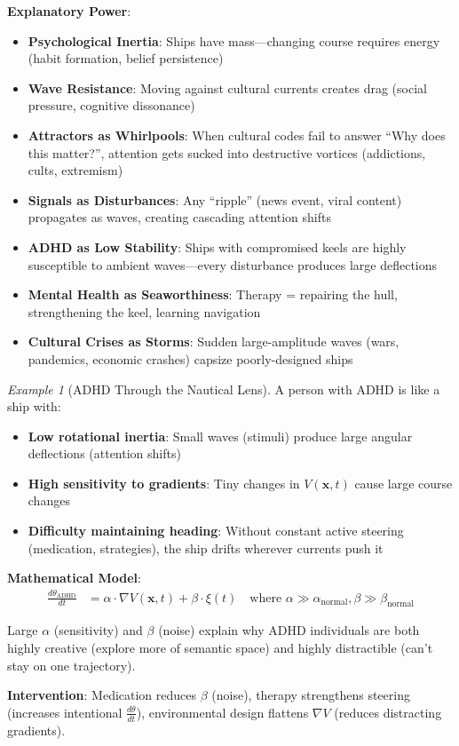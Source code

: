 \documentclass[11pt,a4paper]{article}
\theoremstyle{definition}
\theoremstyle{remark}
\newtheorem{example}{Example}[section]
\begin{document}
\begin{mdframed}[backgroundcolor=cyan!5,linewidth=2pt]
\textbf{Explanatory Power}:
\begin{itemize}
\item \textbf{Psychological Inertia}: Ships have mass—changing course requires energy (habit formation, belief persistence)
\item \textbf{Wave Resistance}: Moving against cultural currents creates drag (social pressure, cognitive dissonance)
\item \textbf{Attractors as Whirlpools}: When cultural codes fail to answer ``Why does this matter?'', attention gets sucked into destructive vortices (addictions, cults, extremism)
\item \textbf{Signals as Disturbances}: Any ``ripple'' (news event, viral content) propagates as waves, creating cascading attention shifts
\item \textbf{ADHD as Low Stability}: Ships with compromised keels are highly susceptible to ambient waves—every disturbance produces large deflections
\item \textbf{Mental Health as Seaworthiness}: Therapy = repairing the hull, strengthening the keel, learning navigation
\item \textbf{Cultural Crises as Storms}: Sudden large-amplitude waves (wars, pandemics, economic crashes) capsize poorly-designed ships
\end{itemize}
\end{mdframed}

\begin{example}[ADHD Through the Nautical Lens]
A person with ADHD is like a ship with:
\begin{itemize}
    \item \textbf{Low rotational inertia}: Small waves (stimuli) produce large angular deflections (attention shifts)
    \item \textbf{High sensitivity to gradients}: Tiny changes in \(V(\mathbf{x},t)\) cause large course changes
    \item \textbf{Difficulty maintaining heading}: Without constant active steering (medication, strategies), the ship drifts wherever currents push it
\end{itemize}

\textbf{Mathematical Model}:
\begin{align}
\frac{d\theta_{\text{ADHD}}}{dt} &= \alpha \cdot \nabla V(\mathbf{x},t) + \beta \cdot \xi(t) \quad \text{where } \alpha \gg \alpha_{\text{normal}}, \beta \gg \beta_{\text{normal}}
\end{align}

Large \(\alpha\) (sensitivity) and \(\beta\) (noise) explain why ADHD individuals are both highly creative (explore more of semantic space) and highly distractible (can't stay on one trajectory).

\textbf{Intervention}: Medication reduces \(\beta\) (noise), therapy strengthens steering (increases intentional \(\frac{d\theta}{dt}\)), environmental design flattens \(\nabla V\) (reduces distracting gradients).
\end{example}
\end{document}
